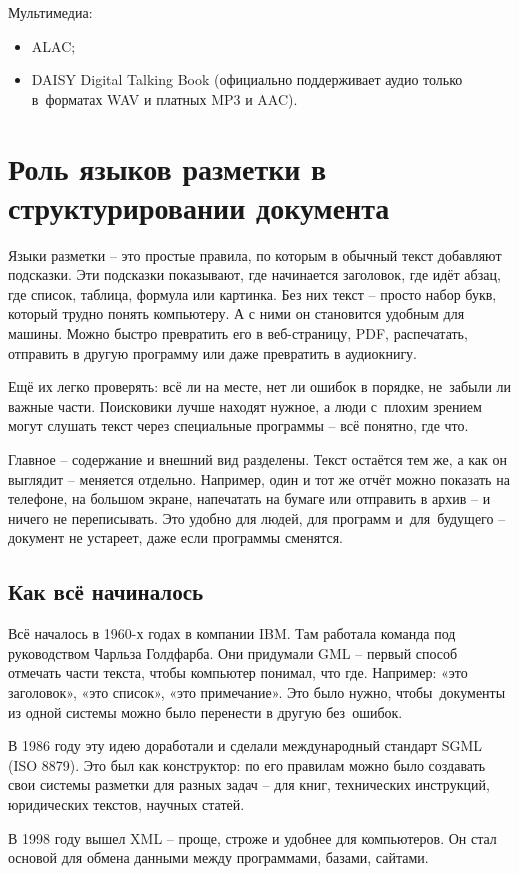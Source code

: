 \documentclass{ou}
\begin{document}
Мультимедиа:
\begin{itemize}[label=-, leftmargin=0em, itemindent=3.35em, nosep]
\item ALAC;
\item DAISY Digital Talking Book (официально поддерживает аудио только в~форматах WAV и платных MP3 и AAC).
\end{itemize}
\newpage
\section{Роль языков разметки в структурировании документа}
Языки разметки -- это простые правила, по которым в обычный текст добавляют подсказки. Эти подсказки показывают, где начинается заголовок, где идёт абзац, где список, таблица, формула или картинка. Без них текст -- просто набор букв, который трудно понять компьютеру. А с ними он становится удобным для машины. Можно быстро превратить его в веб-страницу, PDF, распечатать, отправить в другую программу или даже превратить в аудиокнигу.

Ещё их легко проверять: всё ли на месте, нет ли ошибок в порядке, не~забыли ли важные части. Поисковики лучше находят нужное, а люди с~плохим зрением могут слушать текст через специальные программы -- всё понятно, где что.

Главное -- содержание и внешний вид разделены. Текст остаётся тем же, а как он выглядит -- меняется отдельно. Например, один и тот же отчёт можно показать на телефоне, на большом экране, напечатать на бумаге или отправить в архив -- и ничего не переписывать. Это удобно для людей, для программ и~для~будущего -- документ не устареет, даже если программы сменятся.
\subsection{Как всё начиналось}
Всё началось в 1960-х годах в компании IBM. Там работала команда под руководством Чарльза Голдфарба. Они придумали GML -- первый способ отмечать части текста, чтобы компьютер понимал, что где. Например: «это заголовок», «это список», «это примечание». Это было нужно, чтобы~документы из одной системы можно было перенести в другую без~ошибок.

В 1986 году эту идею доработали и сделали международный стандарт SGML (ISO 8879). Это был как конструктор: по его правилам можно было создавать свои системы разметки для разных задач -- для книг, технических инструкций, юридических текстов, научных статей.

В 1998 году вышел XML -- проще, строже и удобнее для компьютеров. Он стал основой для обмена данными между программами, базами, сайтами.
\end{document}

